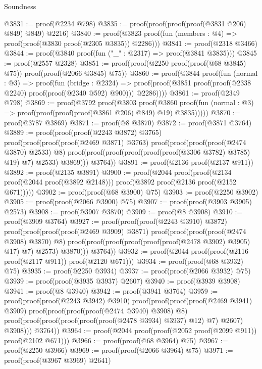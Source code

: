 \begin{lexlean}{Soundness}
\begin{coremodule}
@3831 := proof(@2234 @798)
@3835 := proof(proof(proof(proof(@3831 @206) @849) @849) @2216)
@3840 := proof(@3823 proof(fun (members : @4) => proof(proof(@3830 proof(@2305 @3835)) @2286)))
@3841 := proof(@2318 @3466)
@3844 := proof(@3840 proof(fun ("_" : @2317) => proof(@3841 @3835)))
@3845 := proof(@2557 @2328)
@3851 := proof(proof(@2250 proof(proof(@68 @3845) @75)) proof(proof(@2066 @3845) @75))
@3860 := proof(@3844
      proof(fun (normal : @3) =>
        proof(fun (bridge : @2324) =>
          proof(proof(@3851 proof(proof(@2338 @2240) proof(proof(@2340 @592) @900))) @2286))))
@3861 := proof(@2349 @798)
@3869 := proof(@3792
      proof(@3803
          proof(@3860
              proof(fun (normal : @3) => proof(proof(proof(proof(@3861 @206) @849) @19) @3835)))))
@3870 := proof(@3787 @3869)
@3871 := proof(@8 @3870)
@3872 := proof(@3871 @3764)
@3889 := proof(proof(proof(@2243 @3872) @3765)
      proof(proof(proof(proof(@2469 @3871) @3763)
            proof(proof(proof(proof(@2474 @3870) @2533) @8)
                proof(proof(proof(proof(proof(proof(@3306 @3782) @3785) @19) @7) @2533) @3869)))
          @3764))
@3891 := proof(@2136 proof(@2137 @911))
@3892 := proof(@2135 @3891)
@3900 := proof(@2044
      proof(proof(@2134 proof(@2044 proof(@3892 @2148)))
          proof(@3892 proof(@2136 proof(@2152 @671)))))
@3902 := proof(proof(@68 @3900) @75)
@3903 := proof(@2250 @3902)
@3905 := proof(proof(@2066 @3900) @75)
@3907 := proof(proof(@3903 @3905) @2573)
@3908 := proof(@3907 @3870)
@3909 := proof(@8 @3908)
@3910 := proof(@3909 @3764)
@3927 := proof(proof(proof(@2243 @3910) @3872)
      proof(proof(proof(proof(@2469 @3909) @3871)
            proof(proof(proof(proof(@2474 @3908) @3870) @8)
                proof(proof(proof(proof(proof(proof(@2478 @3902) @3905) @17) @7) @2573) @3870)))
          @3764))
@3932 := proof(@2044 proof(proof(@2116 proof(@2117 @911)) proof(@2120 @671)))
@3934 := proof(proof(@68 @3932) @75)
@3935 := proof(@2250 @3934)
@3937 := proof(proof(@2066 @3932) @75)
@3939 := proof(proof(@3935 @3937) @2607)
@3940 := proof(@3939 @3908)
@3941 := proof(@8 @3940)
@3942 := proof(@3941 @3764)
@3959 := proof(proof(proof(@2243 @3942) @3910)
      proof(proof(proof(proof(@2469 @3941) @3909)
            proof(proof(proof(proof(@2474 @3940) @3908) @8)
                proof(proof(proof(proof(proof(proof(@2478 @3934) @3937) @12) @7) @2607) @3908)))
          @3764))
@3964 := proof(@2044 proof(proof(@2052 proof(@2099 @911)) proof(@2102 @671)))
@3966 := proof(proof(@68 @3964) @75)
@3967 := proof(@2250 @3966)
@3969 := proof(proof(@2066 @3964) @75)
@3971 := proof(proof(@3967 @3969) @2641)

\end{coremodule}
\end{lexlean}
